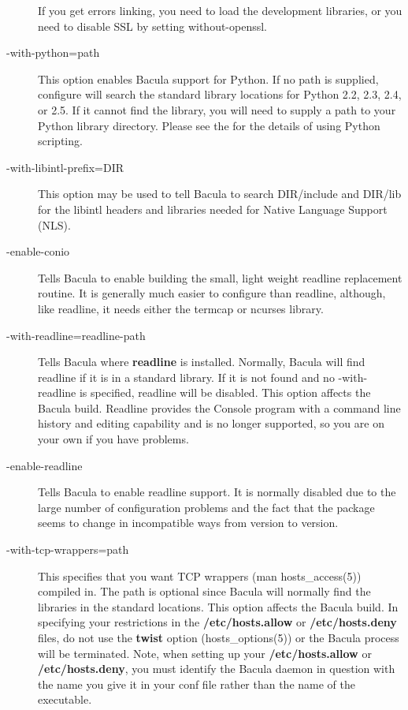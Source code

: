 \begin{description}
   If you get errors linking, you need to load the development libraries,
   or you need to disable SSL by setting without-openssl.


\item [ {-}{\-}with-python=\lt{}path\gt{}]
   This option enables Bacula support for Python.  If no path is supplied,
   configure will search the standard library locations for Python 2.2,
   2.3, 2.4, or 2.5.  If it cannot find the library, you will need to
   supply a path to your Python library directory.  Please see the
    for the details of using Python
   scripting.

\item [ {-}{\-}with-libintl-prefix=\lt{}DIR\gt{}]
   This option may be used to tell Bacula to search DIR/include and
   DIR/lib for the libintl headers and libraries needed for Native
   Language Support (NLS).

\item [ {-}{\-}enable-conio]
   Tells Bacula to enable building the small, light weight readline
   replacement routine.  It is generally much easier to configure than
   readline, although, like readline, it needs either the termcap or
   ncurses library.

\item [ {-}{\-}with-readline=\lt{}readline-path\gt{}]
   Tells Bacula where {\bf readline} is installed.  Normally, Bacula will
   find readline if it is in a standard library.  If it is not found and no
   {-}{\-}with-readline is specified, readline will be disabled.  This
   option affects the Bacula build.  Readline provides the Console program
   with a command line history and editing capability and is no longer
   supported, so you are on your own if you have problems.

\item [ {-}{\-}enable-readline]
   Tells Bacula to enable readline support.  It is normally disabled due to the
   large number of configuration  problems and the fact that the package seems to
   change in incompatible  ways from version to version.  

\item [ {-}{\-}with-tcp-wrappers=\lt{}path\gt{}]
   This specifies that you  want TCP wrappers (man hosts\_access(5)) compiled in.
   The path is optional since  Bacula will normally find the libraries in the
   standard locations.  This option affects the Bacula build.  In specifying your
   restrictions in the {\bf /etc/hosts.allow}  or {\bf /etc/hosts.deny} files, do
   not use the {\bf twist}  option (hosts\_options(5)) or the Bacula process will
   be terminated. Note, when setting up your {\bf /etc/hosts.allow}
   or {\bf /etc/hosts.deny}, you must identify the Bacula daemon in
   question with the name you give it in your conf file rather than the
   name of the executable.
   

\end{description}
